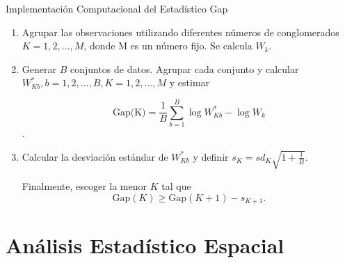 \documentclass{beamer}
\begin{document}
\begin{frame}{Implementación Computacional del Estadístico Gap}
  \begin{enumerate}
  \item Agrupar las observaciones  utilizando diferentes números de conglomerados $K=1,2,\dots,M$, donde M es un número fijo. Se calcula $W_{k}$.

  \item Generar $B$ conjuntos de datos. Agrupar cada conjunto y calcular $W^{\ast}_{Kb},  b=1,2,...,B,  K=1,2,\dots,M$ y estimar 

  \begin{equation}
  \mbox{Gap(K)}=\dfrac{1}{B}\sum_{b=1}^B \log{W^{\ast}_{Kb}}-\log{W_{k}}
  \end{equation}.
  \item Calcular la desviación estándar de $W^{\ast}_{Kb}$ y definir $s_{K}=sd_{K}\sqrt{1+\frac{1}{B}}$.


  Finalmente, escoger la menor $K$ tal que
    \begin{equation}\label{tibshiranicriteria}
    \mbox{Gap}(K) \geq \mbox{Gap}(K+1)-s_{K+1}.
    \end{equation} 

  \end{enumerate}
\end{frame}

\section{Análisis Estadístico Espacial}
\end{document}
